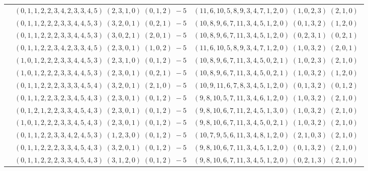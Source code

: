 \documentclass[11pt]{article}
\begin{document}
\begin{longtable}[l]{|c|c|c|}
 \cline{2-3} 
 & $(0 ,1 ,1 ,2 ,2 ,3 ,4 ,2 ,3 ,3 ,4 ,5) \;(2 ,3 ,1 ,0) \;(0 ,1 ,2) \;-5$ & $(11 ,6 ,10 ,5 ,8 ,9 ,3 ,4 ,7 ,1 ,2 ,0) \;(1 ,0 ,2 ,3) \;(2 ,1 ,0) \;$\\ 
 \cline{2-3} 
 & $(0 ,1 ,1 ,2 ,2 ,2 ,3 ,3 ,4 ,4 ,5 ,3) \;(3 ,2 ,0 ,1) \;(0 ,2 ,1) \;-5$ & $(10 ,8 ,9 ,6 ,7 ,11 ,3 ,4 ,5 ,1 ,2 ,0) \;(0 ,1 ,3 ,2) \;(1 ,2 ,0) \;$\\ 
 \cline{2-3} 
 & $(0 ,1 ,1 ,2 ,2 ,2 ,3 ,3 ,4 ,4 ,5 ,3) \;(3 ,0 ,2 ,1) \;(2 ,0 ,1) \;-5$ & $(10 ,8 ,9 ,6 ,7 ,11 ,3 ,4 ,5 ,1 ,2 ,0) \;(0 ,2 ,3 ,1) \;(0 ,2 ,1) \;$\\ 
 \cline{2-3} 
 & $(0 ,1 ,1 ,2 ,2 ,3 ,4 ,2 ,3 ,3 ,4 ,5) \;(2 ,3 ,0 ,1) \;(1 ,0 ,2) \;-5$ & $(11 ,6 ,10 ,5 ,8 ,9 ,3 ,4 ,7 ,1 ,2 ,0) \;(1 ,0 ,3 ,2) \;(2 ,0 ,1) \;$\\ 
 \cline{2-3} 
 & $(1 ,0 ,1 ,2 ,2 ,2 ,3 ,3 ,4 ,4 ,5 ,3) \;(2 ,3 ,1 ,0) \;(0 ,1 ,2) \;-5$ & $(10 ,8 ,9 ,6 ,7 ,11 ,3 ,4 ,5 ,0 ,2 ,1) \;(1 ,0 ,2 ,3) \;(2 ,1 ,0) \;$\\ 
 \cline{2-3} 
 & $(1 ,0 ,1 ,2 ,2 ,2 ,3 ,3 ,4 ,4 ,5 ,3) \;(2 ,3 ,0 ,1) \;(0 ,2 ,1) \;-5$ & $(10 ,8 ,9 ,6 ,7 ,11 ,3 ,4 ,5 ,0 ,2 ,1) \;(1 ,0 ,3 ,2) \;(1 ,2 ,0) \;$\\ 
 \cline{2-3} 
 & $(0 ,1 ,1 ,2 ,2 ,2 ,3 ,3 ,3 ,4 ,5 ,4) \;(3 ,2 ,0 ,1) \;(2 ,1 ,0) \;-5$ & $(10 ,9 ,11 ,6 ,7 ,8 ,3 ,4 ,5 ,1 ,2 ,0) \;(0 ,1 ,3 ,2) \;(0 ,1 ,2) \;$\\ 
 \cline{2-3} 
 & $(0 ,1 ,1 ,2 ,2 ,3 ,2 ,3 ,4 ,5 ,4 ,3) \;(2 ,3 ,0 ,1) \;(0 ,1 ,2) \;-5$ & $(9 ,8 ,10 ,5 ,7 ,11 ,3 ,4 ,6 ,1 ,2 ,0) \;(1 ,0 ,3 ,2) \;(2 ,1 ,0) \;$\\ 
 \cline{2-3} 
 & $(0 ,1 ,2 ,1 ,2 ,2 ,3 ,3 ,4 ,5 ,4 ,3) \;(2 ,3 ,0 ,1) \;(0 ,1 ,2) \;-5$ & $(9 ,8 ,10 ,6 ,7 ,11 ,2 ,4 ,5 ,1 ,3 ,0) \;(1 ,0 ,3 ,2) \;(2 ,1 ,0) \;$\\ 
 \cline{2-3} 
 & $(1 ,0 ,1 ,2 ,2 ,2 ,3 ,3 ,4 ,5 ,4 ,3) \;(2 ,3 ,0 ,1) \;(0 ,1 ,2) \;-5$ & $(9 ,8 ,10 ,6 ,7 ,11 ,3 ,4 ,5 ,0 ,2 ,1) \;(1 ,0 ,3 ,2) \;(2 ,1 ,0) \;$\\ 
 \cline{2-3} 
 & $(0 ,1 ,1 ,2 ,2 ,3 ,3 ,4 ,2 ,4 ,5 ,3) \;(1 ,2 ,3 ,0) \;(0 ,1 ,2) \;-5$ & $(10 ,7 ,9 ,5 ,6 ,11 ,3 ,4 ,8 ,1 ,2 ,0) \;(2 ,1 ,0 ,3) \;(2 ,1 ,0) \;$\\ 
 \cline{2-3} 
 & $(0 ,1 ,1 ,2 ,2 ,2 ,3 ,3 ,4 ,5 ,4 ,3) \;(3 ,2 ,0 ,1) \;(0 ,1 ,2) \;-5$ & $(9 ,8 ,10 ,6 ,7 ,11 ,3 ,4 ,5 ,1 ,2 ,0) \;(0 ,1 ,3 ,2) \;(2 ,1 ,0) \;$\\ 
 \cline{2-3} 
 & $(0 ,1 ,1 ,2 ,2 ,2 ,3 ,3 ,4 ,5 ,4 ,3) \;(3 ,1 ,2 ,0) \;(0 ,1 ,2) \;-5$ & $(9 ,8 ,10 ,6 ,7 ,11 ,3 ,4 ,5 ,1 ,2 ,0) \;(0 ,2 ,1 ,3) \;(2 ,1 ,0) \;$\\ 

\end{longtable}
\end{document}
